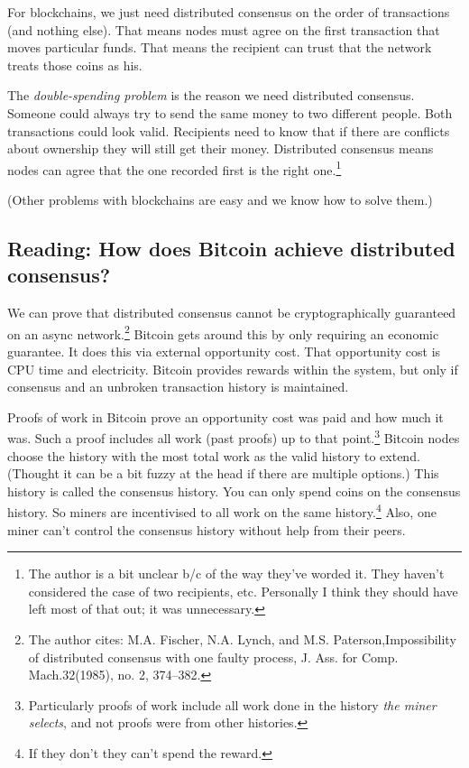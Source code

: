 \documentclass{article}
\begin{document}
For blockchains, we just need distributed consensus on the order of transactions (and nothing else). That means nodes must agree on the first transaction that moves particular funds. That means the recipient can trust that the network treats those coins as his.

The \emph{double-spending problem} is the reason we need distributed consensus. Someone could always try to send the same money to two different people. Both transactions could look valid. Recipients need to know that if there are conflicts about ownership they will still get their money. Distributed consensus means nodes can agree that the one recorded first is the right one.\footnote{The author is a bit unclear b/c of the way they've worded it. They haven't considered the case of two recipients, etc. Personally I think they should have left most of that out; it was unnecessary.}

(Other problems with blockchains are easy and we know how to solve them.)

\subsection{Reading: How does Bitcoin achieve distributed consensus?}

We can prove that distributed consensus cannot be cryptographically guaranteed on an async network.\footnote{The author cites: M.A. Fischer, N.A. Lynch, and M.S. Paterson,Impossibility of distributed consensus with one faulty process, J. Ass. for Comp. Mach.32(1985), no. 2, 374–382.} Bitcoin gets around this by only requiring an economic guarantee. It does this via external opportunity cost. That opportunity cost is CPU time and electricity. Bitcoin provides rewards within the system, but only if consensus and an unbroken transaction history is maintained.

Proofs of work in Bitcoin prove an opportunity cost was paid and how much it was. Such a proof includes all work (past proofs) up to that point.\footnote{Particularly proofs of work include all work done in the history \emph{the miner selects}, and not proofs were from other histories.} Bitcoin nodes choose the history with the most total work as the valid history to extend. (Thought it can be a bit fuzzy at the head if there are multiple options.) This history is called the consensus history. You can only spend coins on the consensus history. So miners are incentivised to all work on the same history.\footnote{If they don't they can't spend the reward.} Also, one miner can't control the consensus history without help from their peers.
\end{document}
